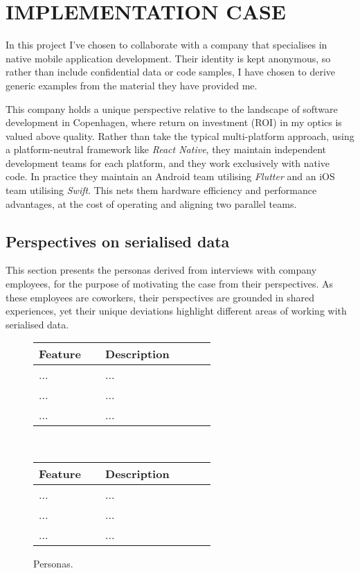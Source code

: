 \documentclass[../report.tex]{subfiles}
\begin{document}
\section{IMPLEMENTATION CASE} \label{sec:case}


In this project I've chosen to collaborate with a company that specialises in native mobile application development. Their identity is kept anonymous, so rather than include confidential data or code samples, I have chosen to derive generic examples from the material they have provided me.

This company holds a unique perspective relative to the landscape of software development in Copenhagen, where return on investment (ROI) in my optics is valued above quality. Rather than take the typical multi-platform approach, using a platform-neutral framework like \textit{React Native}, they maintain independent development teams for each platform, and they work exclusively with native code. In practice they maintain an Android team utilising \textit{Flutter} and an iOS team utilising \textit{Swift}. This nets them hardware efficiency and performance advantages, at the cost of operating and aligning two parallel teams.

\subsection{Perspectives on serialised data}

This section presents the personas derived from interviews with company employees, for the purpose of motivating the case from their perspectives. As these employees are coworkers, their perspectives are grounded in shared experiences, yet their unique deviations highlight different areas of working with serialised data. \\

\begin{figure*}
\def\arraystretch{1.5}
\centering
\begin{tabular}{|p{0.3\linewidth}|p{0.5\linewidth}|}
\hline
Feature & Description \\
\hline
... & ... \\ 
... & ... \\ 
... & ... \\ 
\hline
\end{tabular}
\vspace{0.5cm} \\
\begin{tabular}{|p{0.3\linewidth}|p{0.5\linewidth}|}
\hline
Feature & Description \\
\hline
... & ... \\ 
... & ... \\ 
... & ... \\ 
\hline
\end{tabular}
\caption{Personas.}
\label{fig:personas}
\end{figure*}
\end{document}
